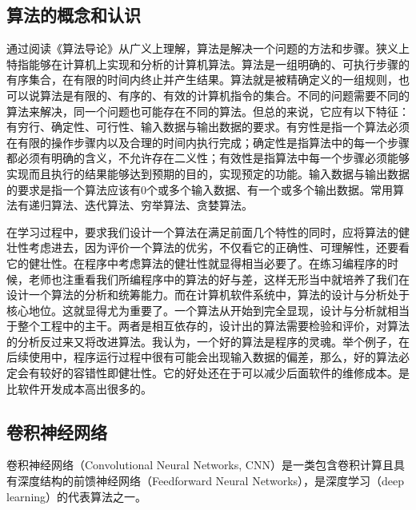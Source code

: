 \documentclass{article}
\begin{document}
\subsection{算法的概念和认识}
通过阅读《算法导论》\citep{suanfadaolun2006}从广义上理解，算法是解决一个问题的方法和步骤。狭义上特指能够在计算机上实现和分析的计算机算法。算法是一组明确的、可执行步骤的有序集合，在有限的时间内终止并产生结果。算法就是被精确定义的一组规则，也可以说算法是有限的、有序的、有效的计算机指令的集合。不同的问题需要不同的算法来解决，同一个问题也可能存在不同的算法。但总的来说，它应有以下特征：有穷行、确定性、可行性、输入数据与输出数据的要求。有穷性是指一个算法必须在有限的操作步骤内以及合理的时间内执行完成；确定性是指算法中的每一个步骤都必须有明确的含义，不允许存在二义性；有效性是指算法中每一个步骤必须能够实现而且执行的结果能够达到预期的目的，实现预定的功能。输入数据与输出数据的要求是指一个算法应该有0个或多个输入数据、有一个或多个输出数据。常用算法有递归算法、迭代算法、穷举算法、贪婪算法。

在学习过程中，要求我们设计一个算法在满足前面几个特性的同时，应将算法的健壮性考虑进去，因为评价一个算法的优劣，不仅看它的正确性、可理解性，还要看它的健壮性。在程序中考虑算法的健壮性就显得相当必要了。在练习编程序的时候，老师也注重看我们所编程序中的算法的好与差，这样无形当中就培养了我们在设计一个算法的分析和统筹能力。而在计算机软件系统中，算法的设计与分析处于核心地位。这就显得尤为重要了。一个算法从开始到完全显现，设计与分析就相当于整个工程中的主干。两者是相互依存的，设计出的算法需要检验和评价，对算法的分析反过来又将改进算法。我认为，一个好的算法是程序的灵魂。举个例子，在后续使用中，程序运行过程中很有可能会出现输入数据的偏差，那么，好的算法必定会有较好的容错性即健壮性。它的好处还在于可以减少后面软件的维修成本。是比软件开发成本高出很多的。 
\subsection{卷积神经网络}
卷积神经网络（Convolutional Neural Networks, CNN）是一类包含卷积计算且具有深度结构的前馈神经网络（Feedforward Neural Networks），是深度学习（deep learning）的代表算法之一。
\end{document}
